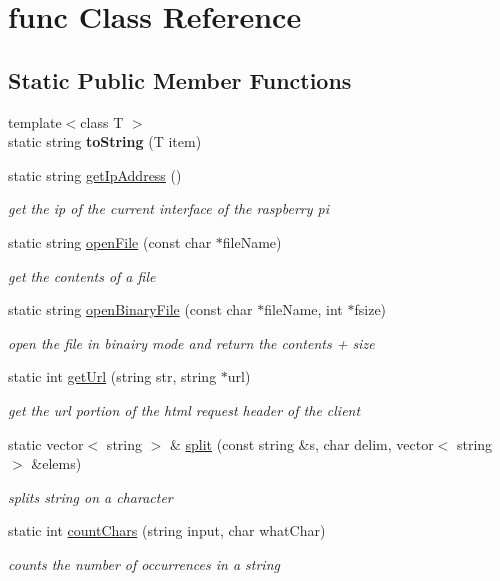 \hypertarget{classfunc}{}\section{func Class Reference}
\label{classfunc}
\subsection*{Static Public Member Functions}
\begin{DoxyCompactItemize}
\item 
\hypertarget{classfunc_ac581d02d88f923f43f6e507b135ba6e5}{}{\footnotesize template$<$class T $>$ }\\static string {\bfseries to\+String} (T item)\label{classfunc_ac581d02d88f923f43f6e507b135ba6e5}

\item 
static string \hyperlink{classfunc_a36bd8c048b9131d38ba31bb61bb41800}{get\+Ip\+Address} ()
\begin{DoxyCompactList}\small\item\em get the ip of the current interface of the raspberry pi \end{DoxyCompactList}\item 
static string \hyperlink{classfunc_a9a5d752d785a76823f94b4cc7c40f411}{open\+File} (const char $\ast$file\+Name)
\begin{DoxyCompactList}\small\item\em get the contents of a file \end{DoxyCompactList}\item 
static string \hyperlink{classfunc_a073c637fff7acd1dbd46ed0e36aca523}{open\+Binary\+File} (const char $\ast$file\+Name, int $\ast$fsize)
\begin{DoxyCompactList}\small\item\em open the file in binairy mode and return the contents + size \end{DoxyCompactList}\item 
static int \hyperlink{classfunc_a7906b81c00a850d060d41ab192f26642}{get\+Url} (string str, string $\ast$url)
\begin{DoxyCompactList}\small\item\em get the url portion of the html request header of the client \end{DoxyCompactList}\item 
static vector$<$ string $>$ \& \hyperlink{classfunc_a4b7932b4cfd2c66a8d64d13bec30e1c8}{split} (const string \&s, char delim, vector$<$ string $>$ \&elems)
\begin{DoxyCompactList}\small\item\em splits string on a character \end{DoxyCompactList}\item 
static int \hyperlink{classfunc_a61132399dfb600836d144459e06491c8}{count\+Chars} (string input, char what\+Char)
\begin{DoxyCompactList}\small\item\em counts the number of occurrences in a string \end{DoxyCompactList}\end{DoxyCompactItemize}


